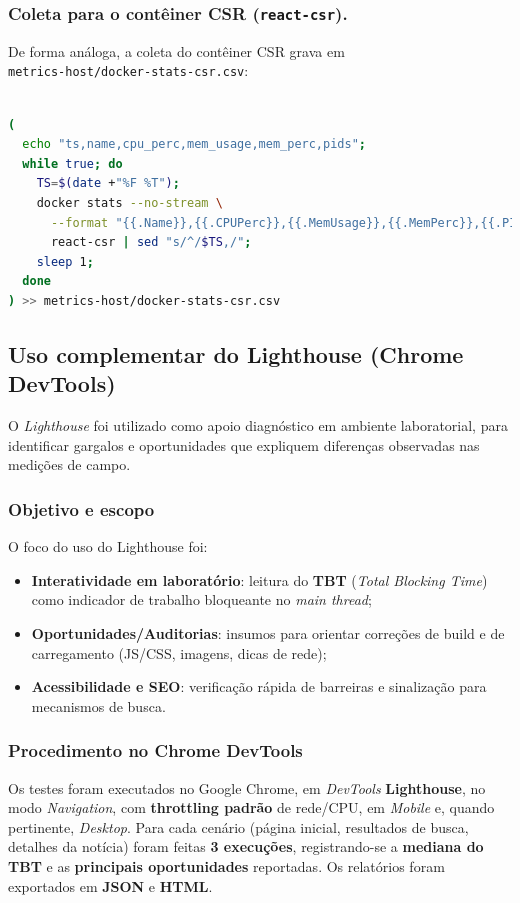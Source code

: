 \subsubsection{Coleta para o contêiner CSR (\texttt{react-csr}).}
De forma análoga, a coleta do contêiner CSR grava em \\ \texttt{metrics-host/docker-stats-csr.csv}:
\\
\\
\begin{lstlisting}[language=bash,caption={Captura de CPU/RAM do contêiner CSR e exportação para CSV}]
(
  echo "ts,name,cpu_perc,mem_usage,mem_perc,pids";
  while true; do
    TS=$(date +"%F %T");
    docker stats --no-stream \
      --format "{{.Name}},{{.CPUPerc}},{{.MemUsage}},{{.MemPerc}},{{.PIDs}}" \
      react-csr | sed "s/^/$TS,/";
    sleep 1;
  done
) >> metrics-host/docker-stats-csr.csv
\end{lstlisting}



\subsection{Uso complementar do Lighthouse (Chrome DevTools)}
\label{ssec:lighthouse}

O \textit{Lighthouse} foi utilizado como apoio diagnóstico em ambiente laboratorial, para identificar gargalos e oportunidades que expliquem diferenças observadas nas medições de campo.

\subsubsection{Objetivo e escopo}
O foco do uso do Lighthouse foi:
\begin{itemize}
  \item \textbf{Interatividade em laboratório}: leitura do \textbf{TBT} (\textit{Total Blocking Time}) como indicador de trabalho bloqueante no \textit{main thread};
  \item \textbf{Oportunidades/Auditorias}: insumos para orientar correções de build e de carregamento (JS/CSS, imagens, dicas de rede);
  \item \textbf{Acessibilidade e SEO}: verificação rápida de barreiras e sinalização para mecanismos de busca.
\end{itemize}

\subsubsection{Procedimento no Chrome DevTools}
Os testes foram executados no Google Chrome, em \textit{DevTools} \textrightarrow{} \textbf{Lighthouse}, no modo \textit{Navigation}, com \textbf{throttling padrão} de rede/CPU, em \textit{Mobile} e, quando pertinente, \textit{Desktop}. Para cada cenário (página inicial, resultados de busca, detalhes da notícia) foram feitas \textbf{3 execuções}, registrando-se a \textbf{mediana do TBT} e as \textbf{principais oportunidades} reportadas. Os relatórios foram exportados em \textbf{JSON} e \textbf{HTML}.


